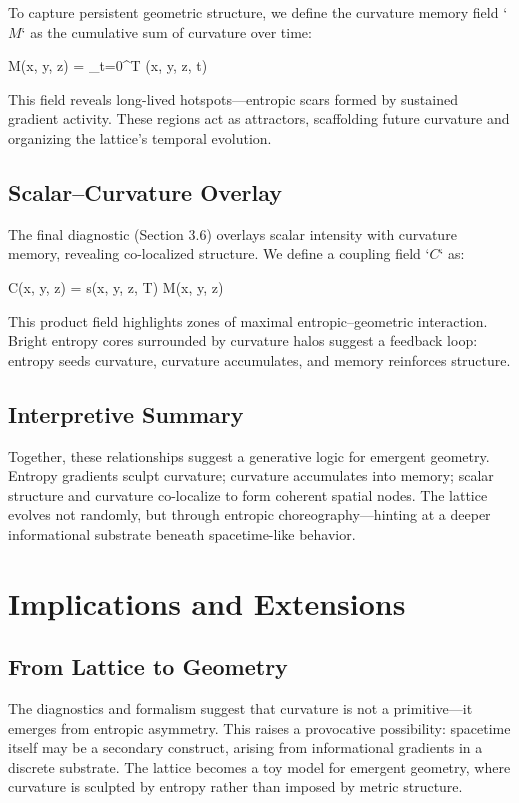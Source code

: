 \documentclass[12pt]{article}
\begin{document}
To capture persistent geometric structure, we define the curvature memory field `\( M \)` as the cumulative sum of curvature over time:

M(x, y, z) = \sum_{t=0}^{T} \kappa(x, y, z, t)


This field reveals long-lived hotspots—entropic scars formed by sustained gradient activity. These regions act as attractors, scaffolding future curvature and organizing the lattice’s temporal evolution.

\subsection{Scalar–Curvature Overlay}

The final diagnostic (Section 3.6) overlays scalar intensity with curvature memory, revealing co-localized structure. We define a coupling field `\( C \)` as:

C(x, y, z) = s(x, y, z, T) \cdot M(x, y, z)

This product field highlights zones of maximal entropic–geometric interaction. Bright entropy cores surrounded by curvature halos suggest a feedback loop: entropy seeds curvature, curvature accumulates, and memory reinforces structure.

\subsection{Interpretive Summary}

Together, these relationships suggest a generative logic for emergent geometry. Entropy gradients sculpt curvature; curvature accumulates into memory; scalar structure and curvature co-localize to form coherent spatial nodes. The lattice evolves not randomly, but through entropic choreography—hinting at a deeper informational substrate beneath spacetime-like behavior.

\section{Implications and Extensions}

\subsection{From Lattice to Geometry}

The diagnostics and formalism suggest that curvature is not a primitive—it emerges from entropic asymmetry. This raises a provocative possibility: spacetime itself may be a secondary construct, arising from informational gradients in a discrete substrate. The lattice becomes a toy model for emergent geometry, where curvature is sculpted by entropy rather than imposed by metric structure.
\end{document}
